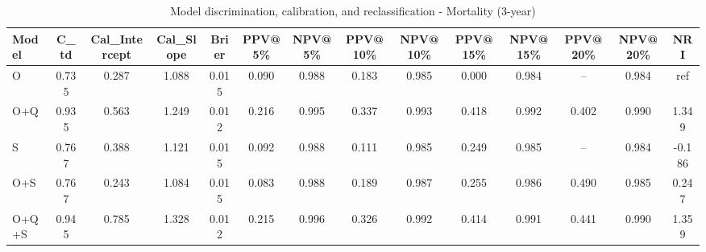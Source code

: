 \begin{table}[htbp]
\centering
\small
\caption{Model discrimination, calibration, and reclassification - Mortality (3-year)}
\label{tab:perf_mortality_3y}
\begin{tabular}{lccccccccccccc}
\toprule
Model & C\_td & Cal\_Intercept & Cal\_Slope & Brier & PPV@5\% & NPV@5\% & PPV@10\% & NPV@10\% & PPV@15\% & NPV@15\% & PPV@20\% & NPV@20\% & NRI \\
\midrule
O & 0.735 & 0.287 & 1.088 & 0.015 & 0.090 & 0.988 & 0.183 & 0.985 & 0.000 & 0.984 & -- & 0.984 & ref \\
O+Q & 0.935 & 0.563 & 1.249 & 0.012 & 0.216 & 0.995 & 0.337 & 0.993 & 0.418 & 0.992 & 0.402 & 0.990 & 1.349 \\
S & 0.767 & 0.388 & 1.121 & 0.015 & 0.092 & 0.988 & 0.111 & 0.985 & 0.249 & 0.985 & -- & 0.984 & -0.186 \\
O+S & 0.767 & 0.243 & 1.084 & 0.015 & 0.083 & 0.988 & 0.189 & 0.987 & 0.255 & 0.986 & 0.490 & 0.985 & 0.247 \\
O+Q+S & 0.945 & 0.785 & 1.328 & 0.012 & 0.215 & 0.996 & 0.326 & 0.992 & 0.414 & 0.991 & 0.441 & 0.990 & 1.359 \\
\bottomrule
\end{tabular}
\end{table}